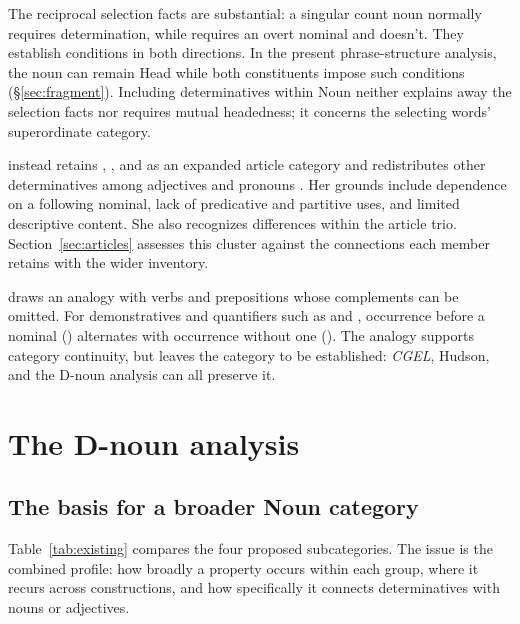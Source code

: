 \documentclass[12pt]{article}
\begin{document}
The reciprocal selection facts are substantial: a singular count noun normally requires determination, while  requires an overt nominal and  doesn't. They establish conditions in both directions. In the present phrase-structure analysis, the noun can remain Head while both constituents impose such conditions (§\ref{sec:fragment}). Including determinatives within Noun neither explains away the selection facts nor requires mutual headedness; it concerns the selecting words' superordinate category.

\textcite[153--158]{spinillo2004reconceptualising} instead retains , , and  as an expanded article category and redistributes other determinatives among adjectives and pronouns \citep[194--195]{spinillo2004reconceptualising}. Her grounds include dependence on a following nominal, lack of predicative and partitive uses, and limited descriptive content. She also recognizes differences within the article trio. Section~\ref{sec:articles} assesses this cluster against the connections each member retains with the wider inventory.

\textcite[140--144]{spinillo2004reconceptualising} draws an analogy with verbs and prepositions whose complements can be omitted. For demonstratives and quantifiers such as  and , occurrence before a nominal () alternates with occurrence without one (). The analogy supports category continuity, but leaves the category to be established: \textit{CGEL}, Hudson, and the D-noun analysis can all preserve it.

\section{The D-noun analysis}\label{sec:proposal}

\subsection{The basis for a broader Noun category}\label{sec:membership}

Table~\ref{tab:existing} compares the four proposed subcategories. The issue is the combined profile: how broadly a property occurs within each group, where it recurs across constructions, and how specifically it connects determinatives with nouns or adjectives.
\end{document}
